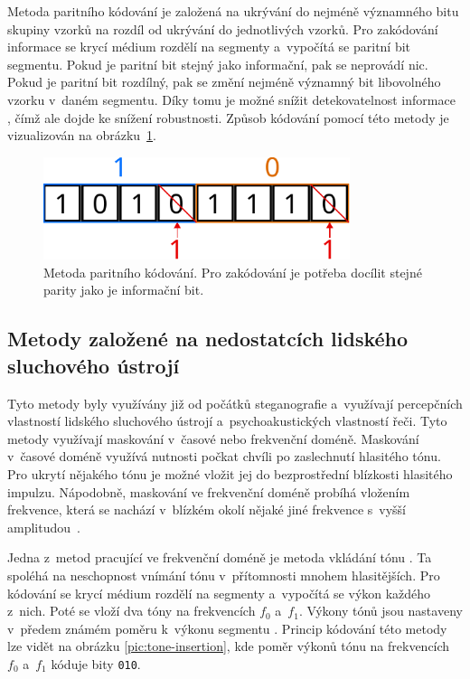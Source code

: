 Metoda paritního kódování je založená na ukrývání do nejméně významného bitu
skupiny vzorků na rozdíl od ukrývání do jednotlivých vzorků. Pro zakódování
informace se krycí médium rozdělí na segmenty a~vypočítá se paritní bit
segmentu. Pokud je paritní bit stejný jako informační, pak se neprovádí nic.
Pokud je paritní bit rozdílný, pak se změní nejméně významný bit libovolného
vzorku v~daném segmentu. Díky tomu je možné snížit detekovatelnost informace
\cite{Bandyopadhyay2008}, čímž ale dojde ke snížení robustnosti. Způsob
kódování pomocí této metody je vizualizován na obrázku~\ref{pic:parity-coding}.

\begin{figure}[hbt]
    \centering
    \includegraphics[width=0.8\textwidth]{obrazky/parity-coding.pdf}
    \caption{Metoda paritního kódování. Pro zakódování je potřeba docílit
    stejné parity jako je informační bit.}
    \label{pic:parity-coding}
\end{figure}

\subsection*{Metody založené na nedostatcích lidského sluchového ústrojí}
\label{sub:has}

Tyto metody byly využívány již od počátků steganografie a~využívají percepčních
vlastností lidského sluchového ústrojí a~psychoakustických vlastností řeči.
Tyto metody využívají maskování v~časové nebo frekvenční doméně. Maskování
v~časové doméně využívá nutnosti počkat chvíli po zaslechnutí hlasitého tónu.
Pro ukrytí nějakého tónu je možné vložit jej do bezprostřední blízkosti
hlasitého impulzu. Nápodobně, maskování ve frekvenční doméně probíhá vložením
frekvence, která se nachází v~blízkém okolí nějaké jiné frekvence s~vyšší
amplitudou~\cite{Dutta2020}.

Jedna z~metod pracující ve frekvenční doméně je metoda vkládání tónu
\cite{Dutta2020}. Ta spoléhá na neschopnost vnímání tónu v~přítomnosti mnohem
hlasitějších. Pro kódování se krycí médium rozdělí na segmenty a~vypočítá se
výkon každého z~nich. Poté se vloží dva tóny na frekvencích $f_0$ a~$f_1$.
Výkony tónů jsou nastaveny v~předem známém poměru k~výkonu segmentu
\cite{Djebbar2012}. Princip kódování této metody lze vidět na obrázku
\ref{pic:tone-insertion}, kde poměr výkonů tónu na frekvencích $f_0$ a~$f_1$
kóduje bity \texttt{010}.

